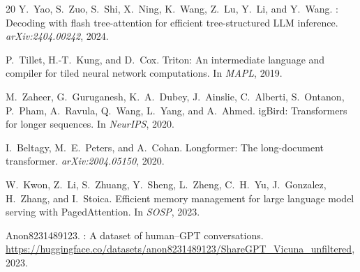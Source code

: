 \documentclass{article}
\begin{document}
\begin{thebibliography}{20}
Y.~Yao, S.~Zuo, S.~Shi, X.~Ning, K.~Wang, Z.~Lu, Y.~Li, and Y.~Wang.
: Decoding with flash tree-attention for efficient
  tree-structured {LLM} inference.
\newblock \emph{arXiv:2404.00242}, 2024.

P.~Tillet, H.-T.~Kung, and D.~Cox.
\newblock Triton: An intermediate language and compiler for tiled neural
  network computations.
\newblock In \emph{MAPL}, 2019.

M.~Zaheer, G.~Guruganesh, K.~A.~Dubey, J.~Ainslie, C.~Alberti, S.~Ontanon,
  P.~Pham, A.~Ravula, Q.~Wang, L.~Yang, and A.~Ahmed.
ig{B}ird: Transformers for longer sequences.
\newblock In \emph{NeurIPS}, 2020.

I.~Beltagy, M.~E.~Peters, and A.~Cohan.
\newblock Longformer: The long-document transformer.
\newblock \emph{arXiv:2004.05150}, 2020.

W.~Kwon, Z.~Li, S.~Zhuang, Y.~Sheng, L.~Zheng, C.~H.~Yu, J.~Gonzalez,
  H.~Zhang, and I.~Stoica.
\newblock Efficient memory management for large language model serving with
  {PagedAttention}.
\newblock In \emph{SOSP}, 2023.

Anon8231489123.
: A dataset of human--{GPT}
  conversations.
\newblock \url{https://huggingface.co/datasets/anon8231489123/ShareGPT_Vicuna_unfiltered},
  2023.

\end{thebibliography}
\end{document}
